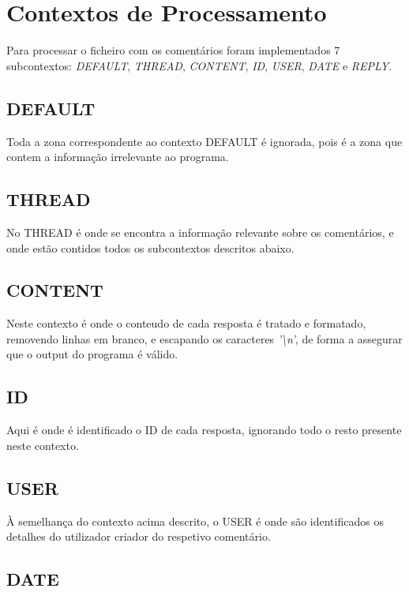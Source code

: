 \documentclass[a4paper]{report}
\begin{document}
\section{Contextos de Processamento}

Para processar o ficheiro com os comentários foram implementados 7 subcontextos:
\textit{DEFAULT}, \textit{THREAD}, \textit{CONTENT}, \textit{ID}, \textit{USER},
\textit{DATE} e \textit{REPLY}.

\subsection{DEFAULT}

Toda a zona correspondente ao contexto DEFAULT é ignorada, pois é a zona
que contem a informação irrelevante ao programa.

\subsection{THREAD}

No THREAD é onde se encontra a informação relevante sobre os comentários,
e onde estão contidos todos os subcontextos descritos abaixo.

\subsection{CONTENT}

Neste contexto é onde o conteudo de cada resposta é tratado e formatado,
removendo linhas em branco, e escapando os caracteres \textit{'\textbackslash n'},
de forma a assegurar que o output do programa é válido.

\subsection{ID}

Aqui é onde é identificado o ID de cada resposta, ignorando todo o resto
presente neste contexto.

\subsection{USER}

À semelhança do contexto acima descrito, o USER é onde são identificados
os detalhes do utilizador criador do respetivo comentário.

\subsection{DATE}
\end{document}
